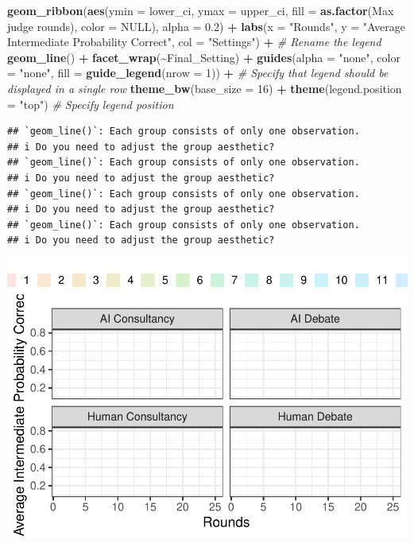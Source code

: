 \documentclass[
]{article}
\newenvironment{Shaded}{\begin{snugshade}}{\end{snugshade}}
\newcommand{\AttributeTok}[1]{\textcolor[rgb]{0.13,0.29,0.53}{#1}}
\newcommand{\CommentTok}[1]{\textcolor[rgb]{0.56,0.35,0.01}{\textit{#1}}}
\newcommand{\ConstantTok}[1]{\textcolor[rgb]{0.56,0.35,0.01}{#1}}
\newcommand{\DecValTok}[1]{\textcolor[rgb]{0.00,0.00,0.81}{#1}}
\newcommand{\FloatTok}[1]{\textcolor[rgb]{0.00,0.00,0.81}{#1}}
\newcommand{\FunctionTok}[1]{\textcolor[rgb]{0.13,0.29,0.53}{\textbf{#1}}}
\newcommand{\NormalTok}[1]{#1}
\newcommand{\SpecialCharTok}[1]{\textcolor[rgb]{0.81,0.36,0.00}{\textbf{#1}}}
\newcommand{\StringTok}[1]{\textcolor[rgb]{0.31,0.60,0.02}{#1}}
\begin{document}
\begin{Shaded}
\begin{Highlighting}[]
  \FunctionTok{geom\_ribbon}\NormalTok{(}\FunctionTok{aes}\NormalTok{(}\AttributeTok{ymin =}\NormalTok{ lower\_ci, }\AttributeTok{ymax =}\NormalTok{ upper\_ci, }\AttributeTok{fill =} \FunctionTok{as.factor}\NormalTok{(}\StringTok{\textasciigrave{}}\AttributeTok{Max judge rounds}\StringTok{\textasciigrave{}}\NormalTok{), }\AttributeTok{color =} \ConstantTok{NULL}\NormalTok{), }\AttributeTok{alpha =} \FloatTok{0.2}\NormalTok{) }\SpecialCharTok{+}
  \FunctionTok{labs}\NormalTok{(}\AttributeTok{x =} \StringTok{"Rounds"}\NormalTok{, }
       \AttributeTok{y =} \StringTok{"Average Intermediate Probability Correct"}\NormalTok{,}
       \AttributeTok{col =} \StringTok{"Settings"}\NormalTok{) }\SpecialCharTok{+}  \CommentTok{\# Rename the legend}
  \FunctionTok{geom\_line}\NormalTok{() }\SpecialCharTok{+}
  \FunctionTok{facet\_wrap}\NormalTok{(}\SpecialCharTok{\textasciitilde{}}\NormalTok{Final\_Setting) }\SpecialCharTok{+}
  \FunctionTok{guides}\NormalTok{(}\AttributeTok{alpha =} \StringTok{"none"}\NormalTok{, }\AttributeTok{color =} \StringTok{"none"}\NormalTok{, }\AttributeTok{fill =} \FunctionTok{guide\_legend}\NormalTok{(}\AttributeTok{nrow =} \DecValTok{1}\NormalTok{)) }\SpecialCharTok{+}  \CommentTok{\# Specify that legend should be displayed in a single row}
  \FunctionTok{theme\_bw}\NormalTok{(}\AttributeTok{base\_size =} \DecValTok{16}\NormalTok{) }\SpecialCharTok{+}
  \FunctionTok{theme}\NormalTok{(}\AttributeTok{legend.position =} \StringTok{"top"}\NormalTok{)  }\CommentTok{\# Specify legend position}
\end{Highlighting}
\end{Shaded}

\begin{verbatim}
## `geom_line()`: Each group consists of only one observation.
## i Do you need to adjust the group aesthetic?
## `geom_line()`: Each group consists of only one observation.
## i Do you need to adjust the group aesthetic?
## `geom_line()`: Each group consists of only one observation.
## i Do you need to adjust the group aesthetic?
## `geom_line()`: Each group consists of only one observation.
## i Do you need to adjust the group aesthetic?
\end{verbatim}

\includegraphics{debate-2309_files/figure-latex/strat ggplot-2.pdf}
\end{document}
